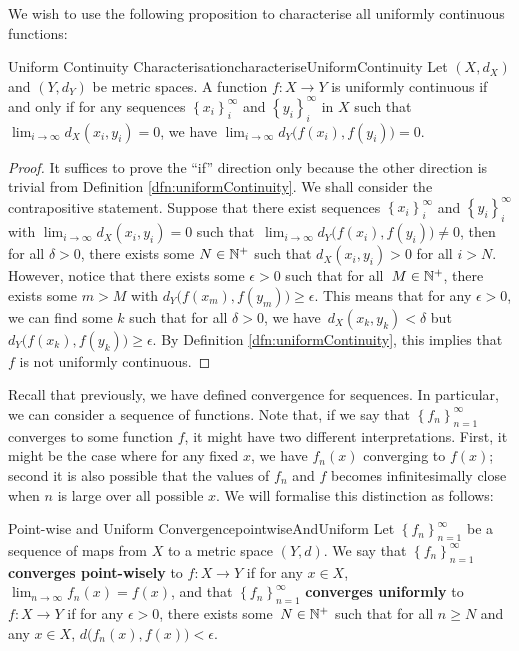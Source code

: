 \documentclass[math]{amznotes}
\theoremstyle{remark}
\begin{document}
We wish to use the following proposition to characterise all uniformly continuous functions:
\begin{probox}{Uniform Continuity Characterisation}{characteriseUniformContinuity}
    Let $\left(X, d_X\right)$ and $\left(Y, d_Y\right)$ be metric spaces. A function $f \colon X \to Y$ is uniformly continuous if and only if for any sequences $\left\{x_i\right\}_i^{\infty}$ and $\left\{y_i\right\}_{i}^{\infty}$ in $X$ such that $\lim_{i \to \infty}d_X\left(x_i, y_i\right) = 0$, we have $\lim_{i \to \infty}d_Y\bigl(f\left(x_i\right), f\left(y_i\right)\bigr) = 0$.
    \tcblower
    \begin{proof}
        It suffices to prove the ``if'' direction only because the other direction is trivial from Definition \ref{dfn:uniformContinuity}. We shall consider the contrapositive statement. Suppose that there exist sequences $\left\{x_i\right\}_i^{\infty}$ and $\left\{y_i\right\}_{i}^{\infty}$ with $\lim_{i \to \infty}d_X\left(x_i, y_i\right) = 0$ such that~$\lim_{i \to \infty}d_Y\bigl(f\left(x_i\right), f\left(y_i\right)\bigr) \neq 0$, then for all $\delta > 0$, there exists some $N \in \mathbb{N}^+$ such that $d_X\left(x_i, y_i\right) > 0$ for all $i > N$. However, notice that there exists some $\epsilon > 0$ such that for all~$M \in \mathbb{N}^+$, there exists some $m > M$ with $d_Y\bigl(f\left(x_m\right), f\left(y_m\right)\bigr) \geq \epsilon$. This means that for any $\epsilon > 0$, we can find some $k$ such that for all $\delta > 0$, we have~$d_X\left(x_k, y_k\right) < \delta$ but $d_Y\bigl(f\left(x_k\right), f\left(y_k\right)\bigr) \geq \epsilon$. By Definition \ref{dfn:uniformContinuity}, this implies that $f$ is not uniformly continuous.
    \end{proof}
\end{probox}
Recall that previously, we have defined convergence for sequences. In particular, we can consider a sequence of functions. Note that, if we say that $\left\{f_n\right\}_{n = 1}^{\infty}$ converges to some function $f$, it might have two different interpretations. First, it might be the case where for any fixed $x$, we have $f_n\left(x\right)$ converging to $f\left(x\right)$; second it is also possible that the values of $f_n$ and $f$ becomes infinitesimally close when $n$ is large over all possible $x$. We will formalise this distinction as follows:
\begin{dfnbox}{Point-wise and Uniform Convergence}{pointwiseAndUniform}
    Let $\left\{f_n\right\}_{n = 1}^{\infty}$ be a sequence of maps from $X$ to a metric space $\left(Y, d\right)$. We say that $\left\{f_n\right\}_{n = 1}^{\infty}$ {\color{red} \textbf{converges point-wisely}} to $f \colon X \to Y$ if for any $x \in X$, $\lim_{n \to \infty}f_n\left(x\right) = f\left(x\right)$, and that $\left\{f_n\right\}_{n = 1}^{\infty}$ {\color{red} \textbf{converges uniformly}} to $f \colon X \to Y$ if for any $\epsilon > 0$, there exists some~$N \in \mathbb{N}^+$ such that for all $n \geq N$ and any $x \in X$, $d\bigl(f_n\left(x\right), f\left(x\right)\bigr) < \epsilon$.
\end{dfnbox}
\end{document}
